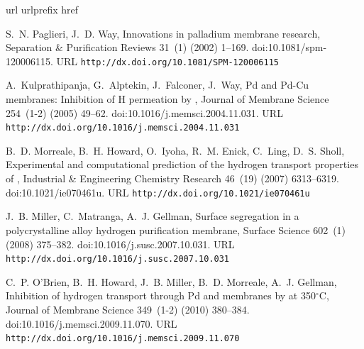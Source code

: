 \documentclass[number, sort&compress, review, 12pt]{elsarticle}
\begin{document}

\begin{thebibliography}{10}
\expandafter\ifx\csname url\endcsname\relax
  \def\url#1{\texttt{#1}}\fi
\expandafter\ifx\csname urlprefix\endcsname\relax\def\urlprefix{URL }\fi
\expandafter\ifx\csname href\endcsname\relax
  \def\href#1#2{#2} \def\path#1{#1}\fi

S.~N. Paglieri, J.~D. Way,
  \href{http://dx.doi.org/10.1081/SPM-120006115}{Innovations in palladium
  membrane research}, Separation \& Purification Reviews 31~(1) (2002) 1--169.
\newblock \href {http://dx.doi.org/10.1081/spm-120006115}
  {\path{doi:10.1081/spm-120006115}}.
\newline\urlprefix\url{http://dx.doi.org/10.1081/SPM-120006115}

A.~Kulprathipanja, G.~Alptekin, J.~Falconer, J.~Way,
  \href{http://dx.doi.org/10.1016/j.memsci.2004.11.031}{{Pd} and {Pd}-{Cu}
  membranes: Inhibition of {H} permeation by }, Journal of Membrane
  Science 254~(1-2) (2005) 49--62.
\newblock \href {http://dx.doi.org/10.1016/j.memsci.2004.11.031}
  {\path{doi:10.1016/j.memsci.2004.11.031}}.
\newline\urlprefix\url{http://dx.doi.org/10.1016/j.memsci.2004.11.031}

B.~D. Morreale, B.~H. Howard, O.~Iyoha, R.~M. Enick, C.~Ling, D.~S. Sholl,
  \href{http://dx.doi.org/10.1021/ie070461u}{Experimental and computational
  prediction of the hydrogen transport properties of }, Industrial \&
  Engineering Chemistry Research 46~(19) (2007) 6313--6319.
\newblock \href {http://dx.doi.org/10.1021/ie070461u}
  {\path{doi:10.1021/ie070461u}}.
\newline\urlprefix\url{http://dx.doi.org/10.1021/ie070461u}

J.~B. Miller, C.~Matranga, A.~J. Gellman,
  \href{http://dx.doi.org/10.1016/j.susc.2007.10.031}{Surface segregation in a
  polycrystalline \ce{Pd_{70}Cu_{30}} alloy hydrogen purification membrane},
  Surface Science 602~(1) (2008) 375--382.
\newblock \href {http://dx.doi.org/10.1016/j.susc.2007.10.031}
  {\path{doi:10.1016/j.susc.2007.10.031}}.
\newline\urlprefix\url{http://dx.doi.org/10.1016/j.susc.2007.10.031}

C.~P. O'Brien, B.~H. Howard, J.~B. Miller, B.~D. Morreale, A.~J. Gellman,
  \href{http://dx.doi.org/10.1016/j.memsci.2009.11.070}{Inhibition of hydrogen
  transport through {P}d and \ce{Pd_{47}Cu_{53}} membranes by \ce{H2S} at
  350$^\circ${C}}, Journal of Membrane Science 349~(1-2) (2010) 380--384.
\newblock \href {http://dx.doi.org/10.1016/j.memsci.2009.11.070}
  {\path{doi:10.1016/j.memsci.2009.11.070}}.
\newline\urlprefix\url{http://dx.doi.org/10.1016/j.memsci.2009.11.070}


\end{thebibliography}
\end{document}
